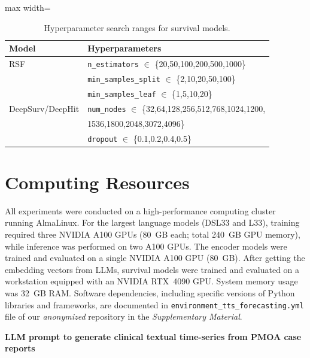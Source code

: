 \begin{table}[t]
\centering
\caption{Hyperparameter search ranges for survival models.}
\label{tab:hyperparams}
\begin{adjustbox}{max width=\columnwidth}
\begin{tabular}{ll}
\toprule
\textbf{Model} & \textbf{Hyperparameters} \\
\midrule
RSF & \texttt{n\_estimators} $\in$ \{20,50,100,200,500,1000\} \\
    & \texttt{min\_samples\_split} $\in$ \{2,10,20,50,100\} \\
    & \texttt{min\_samples\_leaf} $\in$ \{1,5,10,20\} \\
DeepSurv/DeepHit & \texttt{num\_nodes} $\in$ \{32,64,128,256,512,768,1024,1200,\\
& 1536,1800,2048,3072,4096\} \\
    & \texttt{dropout} $\in$ \{0.1,0.2,0.4,0.5\} \\
\bottomrule
\end{tabular}
\end{adjustbox}
\end{table}


\section{Computing Resources}
\label{apd:compute_resource}
All experiments were conducted on a high-performance computing cluster running AlmaLinux. 
For the largest language models (DSL33 and L33), training required three NVIDIA A100 GPUs 
(80~GB each; total 240~GB GPU memory), while inference was performed on two A100 GPUs. 
The encoder models were trained and evaluated on a single NVIDIA A100 GPU (80~GB). 
After getting the embedding vectors from LLMs, survival models were trained and evaluated on a workstation equipped with an NVIDIA RTX~4090 GPU. 
System memory usage was 32~GB RAM. 
Software dependencies, including specific versions of Python libraries and frameworks, are documented in \texttt{environment\_tts\_forecasting.yml} file of our \emph{anonymized} repository in the \emph{Supplementary Material}.


\onecolumn

{ \label{TTS_prompt}
\Large\bfseries\thesection\quad LLM prompt to generate clinical textual time-series from PMOA case reports
}

